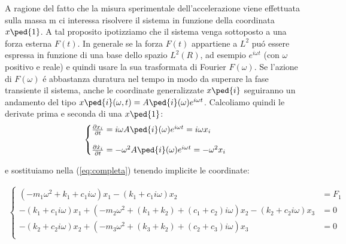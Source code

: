 \documentclass[12pt,a4paper]{article}
\makeatletter
\newenvironment{sistema}%
  {\left\lbrace\begin{array}{@{}l@{}}}%
  {\end{array}\right.}
\makeatother
\begin{document}
	
		A ragione del fatto che la misura sperimentale dell'accelerazione viene effettuata sulla massa m ci interessa risolvere il sistema in funzione della coordinata $x\ped{1}$. A tal proposito ipotizziamo che il sistema venga sottoposto a una forza esterna $F(t)$. In generale se la forza $F(t)$ appartiene a  $L^2$ pu\'o essere espressa in funzione di una base dello spazio $L^2(R)$, ad esempio $e^{i\omega t}$ (con $\omega$ positivo e reale) e quindi usare la sua trasformata di Fourier $F(\omega)$. Se l'azione di $F(\omega)$ \'e abbastanza duratura nel tempo in modo da superare la fase transiente il sistema, anche le coordinate generalizzate $x\ped{i} $ seguiranno un andamento del tipo $x\ped{i}(\omega, t)=A\ped{i}(\omega)e^{i\omega t}$. Calcoliamo quindi le derivate prima e seconda di una $x\ped{1}$:
		\begin {gather}
		\begin{sistema}
		\frac{\partial x_i}{\partial t }= i \omega A\ped{i}(\omega)e^{i\omega t}=i \omega x_i
		\\
		\\
		\frac{\partial \dot x_i}{\partial t }= - \omega ^2 A\ped{i}(\omega)e^{i\omega t}=-\omega^2 x_i
		\end{sistema}
		\end{gather}
		
		e sostituiamo nella (\ref{eq:completa}) tenendo implicite le coordinate:
		
		\begin{gather}
		\begin{cases}
		(-m_1 \omega^2  + k_1 + c_1 i\omega)x_1 - (k_1 + c_1 i\omega)x_2& =  F_1 \\
		-(k_1  + c_1  i\omega)x_1 +(-m_2 \omega^2 + (k_1 +k_2 ) + (c_1 + c_2) i\omega)x_2 - (k_2  + c_2 i\omega)x_3& = 0\\
		-(k_2  + c_2 i\omega)x_2+ (-m_3 \omega^2 + (k_3 +k_2) +(c_2 + c_3) i\omega)x_3& = 0\\
		\end{cases}
		\end{gather}
		
\end{document}
